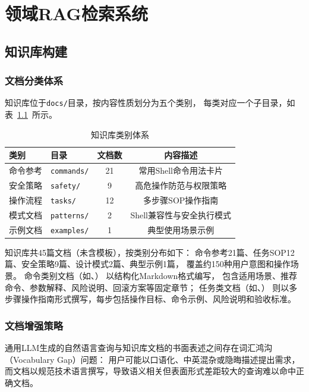 \chapter{领域RAG检索系统}

\section{知识库构建}

\subsection{文档分类体系}

知识库位于\texttt{docs/}目录，按内容性质划分为五个类别，
每类对应一个子目录，如表~\ref{tab:kb-categories}~所示。

\begin{table}[htbp]
\centering
\caption{知识库类别体系}
\label{tab:kb-categories}
\begin{tabular}{llcc}
\toprule
类别 & 目录 & 文档数 & 内容描述 \\
\midrule
命令参考 & \texttt{commands/} & 21 & 常用Shell命令用法卡片 \\
安全策略 & \texttt{safety/}   & 9  & 高危操作防范与权限策略 \\
操作流程 & \texttt{tasks/}    & 12 & 多步骤SOP操作指南 \\
模式文档 & \texttt{patterns/} & 2  & Shell兼容性与安全执行模式 \\
示例文档 & \texttt{examples/} & 1  & 典型使用场景示例 \\
\bottomrule
\end{tabular}
\end{table}

知识库共45篇文档（未含模板），按类别分布如下：
命令参考21篇、任务SOP12篇、安全策略9篇、设计模式2篇、典型示例1篇，
覆盖约150种用户意图和操作场景。
命令类别文档（如、）
以结构化Markdown格式编写，
包含适用场景、推荐命令、参数解释、风险说明、回滚方案等固定章节；
任务类文档（如、）
则以多步骤操作指南形式撰写，每步包括操作目标、命令示例、风险说明和验收标准。

\subsection{文档增强策略}

通用LLM生成的自然语言查询与知识库文档的书面表述之间存在词汇鸿沟
（Vocabulary Gap）问题：
用户可能以口语化、中英混杂或隐晦描述提出需求，
而文档以规范技术语言撰写，导致语义相关但表面形式差距较大的查询难以命中正确文档。

